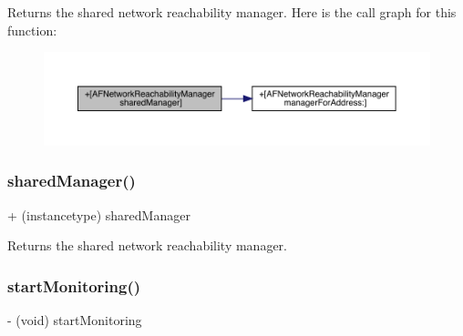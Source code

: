 Returns the shared network reachability manager. Here is the call graph for this function\+:\nopagebreak
\begin{figure}[H]
\begin{center}
\leavevmode
\includegraphics[width=350pt]{interface_a_f_network_reachability_manager_abc98fb713ecc5de942904768512ea1d0_cgraph}
\end{center}
\end{figure}
\mbox{\label{interface_a_f_network_reachability_manager_abc98fb713ecc5de942904768512ea1d0}} 
\subsubsection{\texorpdfstring{shared\+Manager()}{sharedManager()}\hspace{0.1cm}{\footnotesize\ttfamily [3/3]}}
{\footnotesize\ttfamily + (instancetype) shared\+Manager \begin{DoxyParamCaption}{ }\end{DoxyParamCaption}}

Returns the shared network reachability manager. \mbox{\label{interface_a_f_network_reachability_manager_aa455bdcd0711021421aef6e2f87f62d7}} 
\subsubsection{\texorpdfstring{start\+Monitoring()}{startMonitoring()}\hspace{0.1cm}{\footnotesize\ttfamily [1/3]}}
{\footnotesize\ttfamily -\/ (void) start\+Monitoring \begin{DoxyParamCaption}{ }\end{DoxyParamCaption}}

